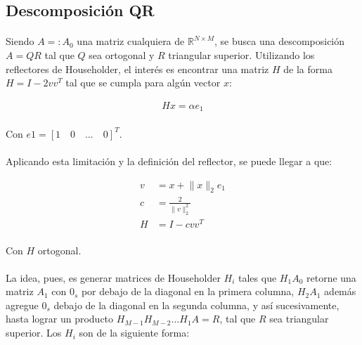 \documentclass[12pt, twocolumn]{article}
\begin{document}
	\subsection{Descomposición QR}
	
	\paragraph{} Siendo $A =: A_{0}$ una matriz cualquiera de $\mathbb{R}^{N\times M}$, se busca una descomposición $A = QR$ tal que $Q$ sea ortogonal y $R$ triangular superior. Utilizando los reflectores de Householder, el interés es encontrar una matriz $H$ de la forma $H = I - 2vv^{T}$ tal que se cumpla para algún vector $x$:
	
	\begin{align}
		Hx = \alpha e_{1}
	\end{align}
	\paragraph{}Con $e1 = \left[1\quad0\quad\dots\quad0\right]^{T}$.
	
	\paragraph{} Aplicando esta limitación y la definición del reflector, se puede llegar a que:
	
	\begin{align}
		v &= x + \lVert x \rVert _{2}e_{1} \\
		c &= \frac{2}{\lVert v \rVert _{2}^{2}} \\
		H &= I - cvv^{T}
	\end{align}
	\paragraph{}Con $H$ ortogonal.
	
	\paragraph{} La idea, pues, es generar matrices de Householder $H_{i}$ tales que $H_{1}A_{0}$ retorne una matriz $A_{1}$ con $0_{s}$ por debajo de la diagonal en la primera columna, $H_{2}A_{1}$ además agregue $0_{s}$ debajo de la diagonal en la segunda columna, y así sucesivamente, hasta lograr un producto $H_{M-1}H_{M-2}\dots H_{1}A = R$, tal que $R$ sea triangular superior. Los $H_{i}$ son de la siguiente forma:
	
\end{document}
